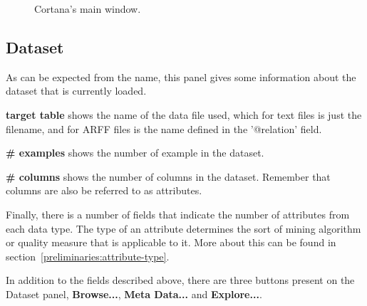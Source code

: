 \documentclass{article}
\begin{document}
\begin{figure}
\begin{center}
\centering
{}
\caption{Cortana's main window.}
\end{center}
\label{fig:mainwindow}
\end{figure}


\subsection{Dataset}
\label{main:dataset}
As can be expected from the name, this panel gives some information about the dataset that is currently loaded.

{\bf target table} shows the name of the data file used, which for text files is just the filename, and for ARFF files is the name defined in the '@relation' field.

{\bf\# examples} shows the number of example in the dataset.

{\bf\# columns} shows the number of columns in the dataset.
Remember that columns are also be referred to as attributes.

Finally, there is a number of fields that indicate the number of attributes from each data type.
The type of an attribute determines the sort of mining algorithm or quality measure that is applicable to it.
More about this can be found in section~\ref{preliminaries:attribute-type}.

In addition to the fields described above, there are three buttons present on the Dataset panel, {\bf Browse...}, {\bf Meta Data...} and {\bf Explore...}.
\end{document}
